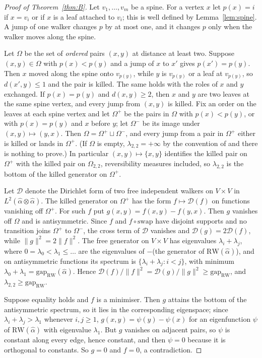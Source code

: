 \documentclass[11pt]{article}
\theoremstyle{remark}
\newcommand{\gap}{\mathrm{gap}}
\newcommand{\RW}{\mathrm{RW}}
\begin{document}
\begin{proof}[Proof of Theorem~\ref{thm:B}]
Let $v_1,\dots,v_m$ be a spine. For a vertex $x$ let $p(x)=i$ if $x=v_i$ or if $x$ is a leaf attached to $v_i$; this is well defined by Lemma~\ref{lem:spine}. A jump of one walker changes $p$ by at most one, and it changes $p$ only when the walker moves along the spine.

Let $\Omega$ be the set of \emph{ordered} pairs $(x,y)$ at distance at least two. Suppose $(x,y)\in\Omega$ with $p(x)<p(y)$ and a jump of $x$ to $x'$ gives $p(x')=p(y)$. Then $x$ moved along the spine onto $v_{p(y)}$, while $y$ is $v_{p(y)}$ or a leaf at $v_{p(y)}$, so $d(x',y)\le1$ and the pair is killed. The same holds with the roles of $x$ and $y$ exchanged. If $p(x)=p(y)$ and $d(x,y)\ge2$, then $x$ and $y$ are two leaves at the same spine vertex, and every jump from $(x,y)$ is killed. Fix an order on the leaves at each spine vertex and let $\Omega^+$ be the pairs in $\Omega$ with $p(x)<p(y)$, or with $p(x)=p(y)$ and $x$ before $y$; let $\Omega^-$ be its image under $(x,y)\mapsto(y,x)$. Then $\Omega=\Omega^+\sqcup\Omega^-$, and every jump from a pair in $\Omega^+$ either is killed or lands in $\Omega^+$. (If $\Omega$ is empty, $\lambda_{2,2}=+\infty$ by the convention of \cite[Corollary~5.7]{KS25} and there is nothing to prove.) In particular $(x,y)\mapsto\{x,y\}$ identifies the killed pair on $\Omega^+$ with the killed pair on $\Omega_{2,2}$, reversibility measures included, so $\lambda_{2,2}$ is the bottom of the killed generator on $\Omega^+$.

Let $\mathcal{D}$ denote the Dirichlet form of two free independent walkers on $V\times V$ in $L^2(\hat\alpha\otimes\hat\alpha)$. The killed generator on $\Omega^+$ has the form $f\mapsto\mathcal{D}(f)$ on functions vanishing off $\Omega^+$. For such $f$ put $g(x,y)=f(x,y)-f(y,x)$. Then $g$ vanishes off $\Omega$ and is antisymmetric. Since $f$ and $f\circ\mathrm{swap}$ have disjoint supports and no transition joins $\Omega^+$ to $\Omega^-$, the cross term of $\mathcal{D}$ vanishes and $\mathcal{D}(g)=2\mathcal{D}(f)$, while $\|g\|^2=2\|f\|^2$. The free generator on $V\times V$ has eigenvalues $\lambda_i+\lambda_j$, where $0=\lambda_0<\lambda_1\le\dots$ are the eigenvalues of $-$(the generator of $\RW(\hat\alpha)$), and on antisymmetric functions its spectrum is $\{\lambda_i+\lambda_j:i<j\}$, with minimum $\lambda_0+\lambda_1=\gap_{\RW}(\hat\alpha)$. Hence $\mathcal{D}(f)/\|f\|^2=\mathcal{D}(g)/\|g\|^2\ge\gap_{\RW}$, and $\lambda_{2,2}\ge\gap_{\RW}$.

Suppose equality holds and $f$ is a minimiser. Then $g$ attains the bottom of the antisymmetric spectrum, so it lies in the corresponding eigenspace; since $\lambda_i+\lambda_j>\lambda_1$ whenever $i,j\ge1$, $g(x,y)=\psi(y)-\psi(x)$ for an eigenfunction $\psi$ of $\RW(\hat\alpha)$ with eigenvalue $\lambda_1$. But $g$ vanishes on adjacent pairs, so $\psi$ is constant along every edge, hence constant, and then $\psi=0$ because it is orthogonal to constants. So $g=0$ and $f=0$, a contradiction.
\end{proof}
\end{document}
